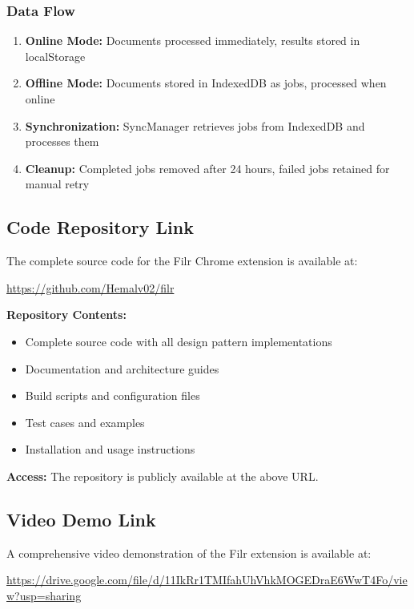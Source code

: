 \documentclass[11pt, a4paper]{article}
\theoremstyle{plain}
\theoremstyle{definition}
\begin{document}
\subsubsection{Data Flow}

\begin{enumerate}
    \item \textbf{Online Mode:} Documents processed immediately, results stored in localStorage
    \item \textbf{Offline Mode:} Documents stored in IndexedDB as jobs, processed when online
    \item \textbf{Synchronization:} SyncManager retrieves jobs from IndexedDB and processes them
    \item \textbf{Cleanup:} Completed jobs removed after 24 hours, failed jobs retained for manual retry
\end{enumerate}

\subsection{Code Repository Link}

The complete source code for the Filr Chrome extension is available at:

\begin{center}
\url{https://github.com/Hemalv02/filr}
\end{center}

\textbf{Repository Contents:}
\begin{itemize}
    \item Complete source code with all design pattern implementations
    \item Documentation and architecture guides
    \item Build scripts and configuration files
    \item Test cases and examples
    \item Installation and usage instructions
\end{itemize}

\textbf{Access:} The repository is publicly available at the above URL.

\subsection{Video Demo Link}

A comprehensive video demonstration of the Filr extension is available at:

\begin{center}
\url{https://drive.google.com/file/d/11IkRr1TMIfahUhVhkMOGEDraE6WwT4Fo/view?usp=sharing}
\end{center}
\end{document}
